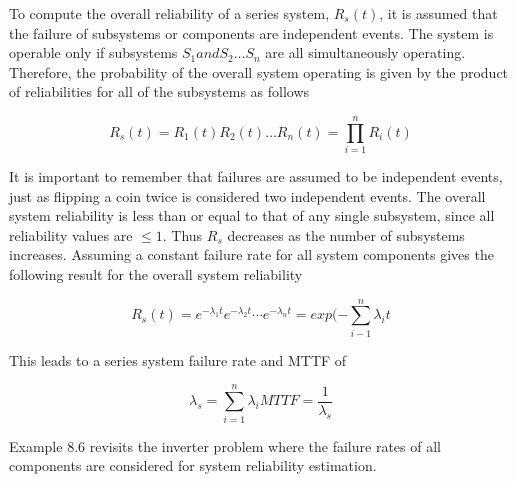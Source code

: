 To compute the overall reliability of a series system, $R_s(t)$, 
it is assumed that the failure
of subsystems or components are independent events. The system is
operable only if subsystems $S_1 and S_2 \ldots S_n$ are all simultaneously
operating. Therefore, the probability of the overall system operating is
given by the product of reliabilities for all of the subsystems as
follows

\begin{equation}
\label{equ:seriesProbability}
R_s(t) = R_1(t)R_2(t)\ldots R_n(t) = \prod_{i=1}^n R_i(t) 
\end{equation}

It is important to remember that failures are assumed to be independent
events, just as flipping a coin twice is considered two independent
events. The overall system reliability is less than or equal to that of
any single subsystem, since all reliability values are $\leq 1$. Thus
$R_s$ decreases as the number of
subsystems increases. Assuming a constant failure rate for all system
components gives the following result for the overall system reliability

\begin{equation}
\label{equ:seriesProbabilityConstantErrorRate}
R_s(t) = e^{-\lambda_1t}e^{-\lambda_2t}\cdots e^{-\lambda_nt} = exp(-\sum_{i-1}^n \lambda_i t
\end{equation}

This leads to a series system failure rate and MTTF of


\begin{equation}
\label{equ:seriesProbabilityMttf}
\lambda_s = \sum_{i=1}^n \lambda_i
MTTF = \frac{1}{\lambda_s}
\end{equation}

Example 8.6 revisits the inverter problem where the failure rates of all
components are considered for system reliability estimation.


